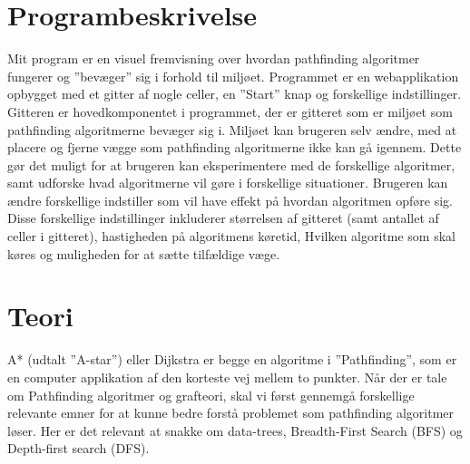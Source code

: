\documentclass[12pt]{article}
\begin{document}
\section{Programbeskrivelse}
Mit program er en visuel fremvisning over hvordan pathfinding algoritmer fungerer og ”bevæger” sig i forhold til miljøet. Programmet er en webapplikation opbygget med et gitter af nogle celler, en ”Start” knap og forskellige indstillinger. 
Gitteren er hovedkomponentet i programmet, der er gitteret som er miljøet som pathfinding algoritmerne bevæger sig i. Miljøet kan brugeren selv ændre, med at placere og fjerne vægge som pathfinding algoritmerne ikke kan gå igennem. Dette gør det muligt for at brugeren kan eksperimentere med de forskellige algoritmer, samt udforske hvad algoritmerne vil gøre i forskellige situationer. Brugeren kan ændre forskellige indstiller som vil have effekt på hvordan algoritmen opføre sig. Disse forskellige indstillinger inkluderer størrelsen af gitteret (samt antallet af celler i gitteret), hastigheden på algoritmens køretid, Hvilken algoritme som skal køres og muligheden for at sætte tilfældige væge. 

\section{Teori}
A* (udtalt ”A-star”) eller Dijkstra er begge en algoritme i ”Pathfinding”, som er en computer applikation af den korteste vej mellem to punkter. Når der er tale om Pathfinding algoritmer og grafteori, skal vi først gennemgå forskellige relevante emner for at kunne bedre forstå problemet som pathfinding algoritmer løser. Her er det relevant at snakke om data-trees, Breadth-First Search (BFS) og Depth-first search (DFS). 
\end{document}
